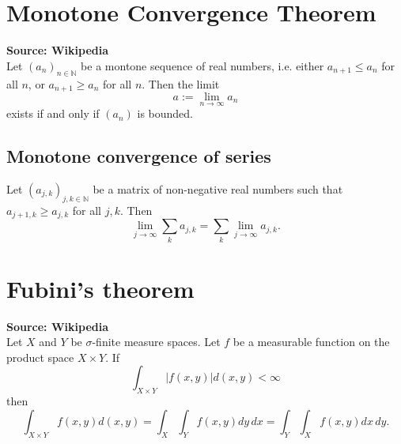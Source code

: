 \documentclass[fleqn]{article}
\newcommand{\1}[1]{\mathbb{I}_{#1}}
\begin{document}
\section{Monotone Convergence Theorem}
\textbf{Source: Wikipedia} \\[10pt]
Let $(a_n)_{n\in\mathbb{N}}$ be a montone sequence of real numbers, i.e. either $a_{n+1} \leq a_n$ for all $n$, or $a_{n+1} \geq a_n$ for all $n$.
Then the limit
\begin{equation*}
a := \lim_{n\to\infty} a_n
\end{equation*}
exists if and only if $(a_n)$ is bounded.

\subsection{Monotone convergence of series}
Let $(a_{j,k})_{j,k\in\mathbb{N}}$ be a matrix of non-negative real numbers such that $a_{j+1,k} \geq a_{j,k}$ for all $j,k$.
Then
\begin{equation*}
\lim_{j\to\infty} \sum_k a_{j,k}
= \sum_k \lim_{j\to\infty} a_{j,k} .
\end{equation*}


\section{Fubini's theorem}
\textbf{Source: Wikipedia} \\[10pt]
Let $X$ and $Y$ be $\sigma$-finite measure spaces.
Let $f$ be a measurable function on the product space $X\times Y$.
If
\begin{equation*}
\int_{X\times Y} | f(x,y) | d(x,y) < \infty
\end{equation*}
then
\begin{equation*}
\int_{X\times Y} f(x,y) d(x,y)
= \int_X \int_Y f(x,y) dy \, dx
= \int_Y \int_X f(x,y) dx \, dy .
\end{equation*}








\printbibliography
\end{document}
